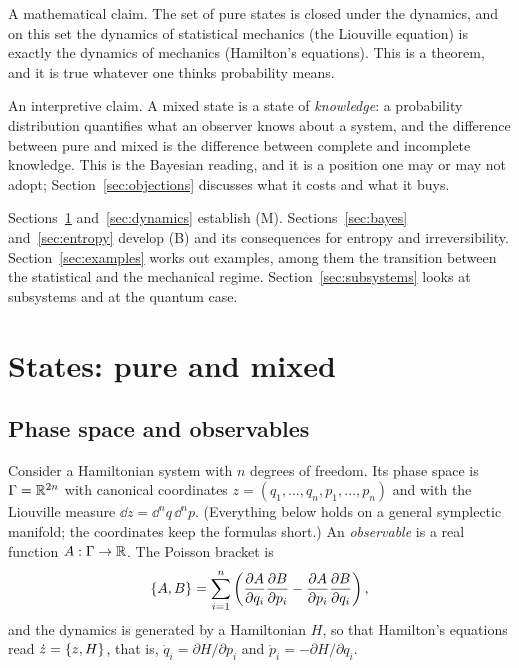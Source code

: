 \begin{description}[nosep,leftmargin=1.5em]
\item[(M)] A mathematical claim. The set of pure states is closed under the dynamics, and on this set the dynamics of statistical mechanics (the Liouville equation) is exactly the dynamics of mechanics (Hamilton's equations). This is a theorem, and it is true whatever one thinks probability means.
\item[(B)] An interpretive claim. A mixed state is a state of \emph{knowledge}: a probability distribution quantifies what an observer knows about a system, and the difference between pure and mixed is the difference between complete and incomplete knowledge. This is the Bayesian reading, and it is a position one may or may not adopt; Section~\ref{sec:objections} discusses what it costs and what it buys.
\end{description}

Sections~\ref{sec:states} and~\ref{sec:dynamics} establish (M). Sections~\ref{sec:bayes} and~\ref{sec:entropy} develop (B) and its consequences for entropy and irreversibility. Section~\ref{sec:examples} works out examples, among them the transition between the statistical and the mechanical regime. Section~\ref{sec:subsystems} looks at subsystems and at the quantum case.

\section{States: pure and mixed}
\label{sec:states}

\subsection{Phase space and observables}

Consider a Hamiltonian system with $n$ degrees of freedom. Its phase space is $\Gamma=\mathbb{R}^{2n}$ with canonical coordinates $z=(q_1,\dots,q_n,p_1,\dots,p_n)$ and with the Liouville measure $\dd z=\dd^n q\,\dd^n p$. (Everything below holds on a general symplectic manifold; the coordinates keep the formulas short.) An \emph{observable} is a real function $A:\Gamma\to\mathbb{R}$. The Poisson bracket is
\begin{equation}
\{A,B\}=\sum_{i=1}^{n}\left(\frac{\partial A}{\partial q_i}\frac{\partial B}{\partial p_i}-\frac{\partial A}{\partial p_i}\frac{\partial B}{\partial q_i}\right),
\end{equation}
and the dynamics is generated by a Hamiltonian $H$, so that Hamilton's equations read $\dot z=\{z,H\}$, that is,
$\dot q_i=\partial H/\partial p_i$ and $\dot p_i=-\partial H/\partial q_i$.

